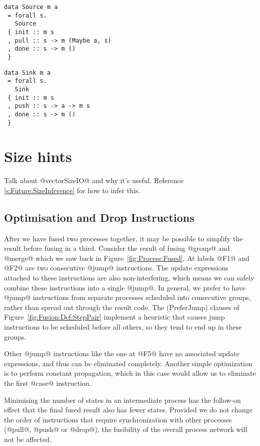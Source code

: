 \begin{lstlisting}
data Source m a
 = forall s.
   Source
 { init :: m s
 , pull :: s -> m (Maybe a, s)
 , done :: s -> m ()
 }
\end{lstlisting}

\begin{lstlisting}
data Sink m a
 = forall s.
   Sink
 { init :: m s
 , push :: s -> a -> m s
 , done :: s -> m ()
 }
\end{lstlisting}

\section{Size hints}
\label{s:implementation:sizehints}
Talk about @vectorSizeIO@ and why it's useful.
Reference \autoref{s:Future:SizeInference} for how to infer this.

\subsection{Optimisation and Drop Instructions}
\label{s:Optimisation}
After we have fused two processes together, it may be possible to simplify the result before fusing in a third. Consider the result of fusing @group@ and @merge@ which we saw back in Figure~\ref{fig:Process:Fused}. At labels @F1@ and @F2@ are two consecutive @jump@ instructions.
The update expressions attached to these instructions are also non-interfering, which means we can safely combine these instructions into a single @jump@.
In general, we prefer to have @jump@ instructions from separate processes scheduled into consecutive groups, rather than spread out through the result code.
The (PreferJump) clauses of Figure~\ref{fig:Fusion:Def:StepPair} implement a heuristic that causes jump instructions to be scheduled before all others, so they tend to end up in these groups.

Other @jump@ instructions like the one at @F5@ have no associated update expressions, and thus can be eliminated completely. Another simple optimization is to perform constant propagation, which in this case would allow us to eliminate the first @case@ instruction. 

Minimising the number of states in an intermediate process has the follow-on effect that the final fused result also has fewer states. Provided we do not change the order of instructions that require synchronization with other processes (@pull@, @push@ or @drop@), the fusibility of the overall process network will not be affected.

